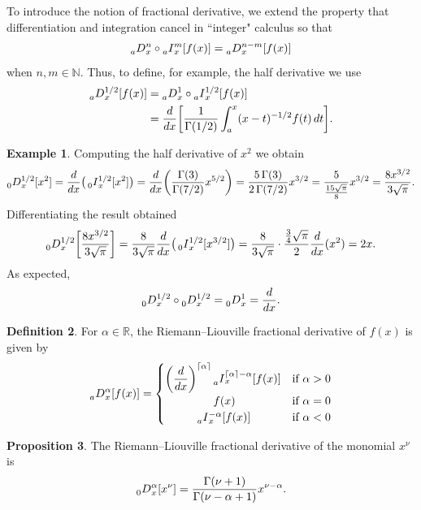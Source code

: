 \documentclass[12pt]{article}
\DeclarePairedDelimiter{\ceil}{\lceil}{\rceil}
\theoremstyle{definition}
\newtheorem{definition}{Definition}
\newtheorem{proposition}[definition]{Proposition}
\newtheorem{example}[definition]{Example}
\newcommand{\D}[2]{\prescript{}{#1}{D}_x^{#2}}
\newcommand{\I}[2]{\prescript{}{#1}{I}_x^{#2}}
\begin{document}
To introduce the notion of fractional derivative, we extend the property that differentiation and integration cancel in ``integer" calculus so that 
\[
\D{a}{n} \circ \I{a}{m} [f(x)] = \D{a}{n-m}[f(x)]
\]
when $n,m\in \mathbb{N}$.  Thus, to define, for example, the half derivative we use
\begin{align*}
\D{a}{1/2}[f(x)] &= \D{a}{1} \circ \I{a}{1/2}[f(x)] \\
&= \frac{d}{dx}\bigg[\frac{1}{\Gamma(1/2)} \int_a^x(x-t)^{-1/2}f(t)\, dt \bigg].
\end{align*}

\begin{example}
Computing the half derivative of $x^2$ we obtain
\[
\D{0}{1/2}[x^2] = \frac{d}{dx}\big(\I{0}{1/2}[x^2]\big) =
 \frac{d}{dx}\bigg(\frac{\Gamma(3)}{\Gamma(7/2)}x^{5/2}\bigg) 
= \frac{5\, \Gamma(3)}{2\, \Gamma(7/2)} x^{3/2} = \frac{5}{\frac{15\sqrt{\pi}}{8}} x^{3/2} = \frac{8 x^{3/2}}{3\sqrt{\pi}}.
\]
Differentiating the result obtained
\[
\D{0}{1/2}\bigg[\frac{8 x^{3/2}}{3\sqrt{\pi}}\bigg] = 
\frac{8}{3\sqrt{\pi}} \frac{d}{dx}\big(\I{0}{1/2}[x^{3/2}]\big)
=\frac{8}{3\sqrt{\pi}} \cdot \frac{\frac{3}{4}\sqrt{\pi}}{2} \frac{d}{dx}(x^2) = 2 x.
\]
As expected,
\[
\D{0}{1/2}\circ \D{0}{1/2} = \D{0}{1} = \frac{d}{dx}.
\]
\end{example}

\begin{definition}
For $\alpha \in \mathbb{R}$, the Riemann--Liouville fractional derivative of $f(x)$ is given by
\[
\D{a}{\alpha}[f(x)] = \begin{cases}
\bigg(\dfrac{d}{dx}\bigg)^{\ceil{\alpha}} \I{a}{\ceil{\alpha}-\alpha} [f(x)] & \text{if } \alpha > 0 \\
\hspace*{1.5cm} f(x) & \text{if } \alpha =0 \\
\hspace*{1cm} \I{a}{-\alpha}[f(x)] &\text{if }\alpha < 0
\end{cases}
\]
\end{definition}

\begin{proposition}
The Riemann--Liouville fractional derivative of the monomial $x^\nu$ is
%
\begin{equation}\label{fder monomial}
\D{0}{\alpha}[x^\nu] =
\frac{\Gamma(\nu+1)}{\Gamma(\nu - \alpha + 1)} x^{\nu-\alpha}.
\end{equation}
\end{proposition}
\end{document}
